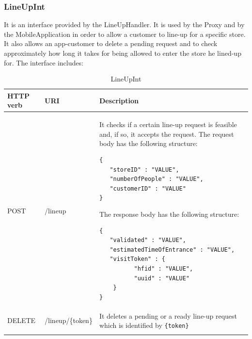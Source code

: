 \documentclass[a4paper,oneside,11pt]{book}
\begin{document}
    \subsubsection{LineUpInt}
    It is an interface provided by the LineUpHandler. It is used by the Proxy and by the MobileApplication in order to allow a customer to line-up for a specific store. It also allows an app-customer to delete a pending request and to check approximately how long it takes for being allowed to enter the store he lined-up for. The interface includes:
    \begin{longtable}[c] { |>{\centering\arraybackslash}H{0.11\textwidth}|>{\centering\arraybackslash\ttfamily}P{0.23\textwidth}|H{0.50\textwidth}| }
        \hline
        \textbf{HTTP verb} & \textrm{\textbf{URI}} & \textbf{\textbf{Description}} \\ \hline
        POST & /lineup & It checks if a certain line-up request is feasible and, if so, it accepts the request. The request body has the following structure:
        \begin{lstlisting}[language=jsonDD]
{
   "storeID" : "VALUE",
   "numberOfPeople" : "VALUE",
   "customerID" : "VALUE"
}
        \end{lstlisting}
        The response body has the following structure:
        \begin{lstlisting}[language=jsonDD]
{
   "validated" : "VALUE",
   "estimatedTimeOfEntrance" : "VALUE",
   "visitToken" : {
          "hfid" : "VALUE",
          "uuid" : "VALUE"
    }
}
        \end{lstlisting}  \\ \hline
        DELETE & /lineup/\{token\} & It deletes a pending or a ready line-up request which is identified by \texttt{\{token\}} \\ \hline
        \caption{LineUpInt}
        \label{table:lineup_int}
    \end{longtable} 
    
    \newpage
\end{document}
